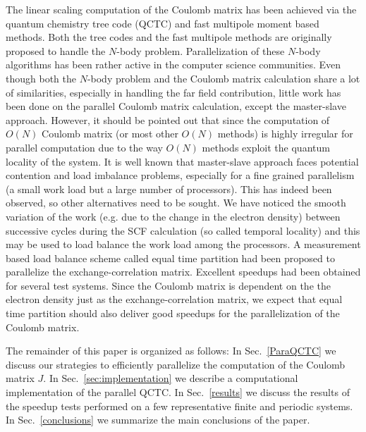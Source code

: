 \commentoutA{\documentclass[prl,aps,twocolumn,twocolumngrid,superbib]{revtex4}}
\begin{document}
The linear scaling computation of the Coulomb matrix has been achieved
via the quantum chemistry tree code
(QCTC)\cite{MChallacombe96,MChallacombe96B,MChallacombe97} and fast
multipole moment based
methods\cite{CWhite94B,CWhite96A,MStrain96,Perezjorda97}.  Both the
tree codes and the fast multipole methods are originally proposed to
handle the $N$-body problem\cite{JBarnes86,LGreengard87}.
Parallelization of these $N$-body algorithms has been rather active in
the computer science
communities\cite{warren:92_article,Grama94_article,Warren95b,Singh93,Singh_95v27,Grama_98v24,Gibbon_2002,Antonuccio-Delogu03}.
Even though both the $N$-body problem and the Coulomb matrix
calculation share a lot of similarities, especially in handling the
far field contribution, little work has been done on the parallel
Coulomb matrix calculation, except the master-slave
approach\cite{Furlani_00v128,Sosa_98v19,Sosa_00v26}.  However, it
should be pointed out that since the computation of $O(N)$ Coulomb
matrix (or most other $O(N)$ methods) is highly irregular for parallel
computation due to the way $O(N)$ methods exploit the quantum locality
of the system.  It is well known that master-slave approach faces
potential contention and load imbalance
problems\cite{BWilkinson99,GWilson95}, especially for a fine grained
parallelism (a small work load but a large number of processors).
This has indeed been observed\cite{Guerra_95}, so other alternatives
need to be sought.  We have noticed the smooth variation of the work
(e.g. due to the change in the electron density) between successive
cycles during the SCF calculation (so called temporal
locality\cite{JPilkington96}) and this may be used to load balance the
work load among the processors. A measurement based load balance
scheme called equal time partition\cite{CGan03} had been proposed to
parallelize the exchange-correlation matrix. Excellent speedups had
been obtained for several test systems.
Since the Coulomb matrix is dependent on the the electron density just
as the exchange-correlation matrix, we expect that equal time
partition should also deliver good speedups for the parallelization of
the Coulomb matrix.

The remainder of this paper is organized as follows: In
Sec.~\ref{ParaQCTC} we discuss our strategies to efficiently
parallelize the computation of the Coulomb matrix $J$. In
Sec.~\ref{sec:implementation} we describe a computational
implementation of the parallel QCTC. In Sec.~\ref{results} we discuss
the results of the speedup tests performed on a few representative
finite and periodic systems. In Sec.~\ref{conclusions} we summarize
the main conclusions of the paper.
\end{document}
